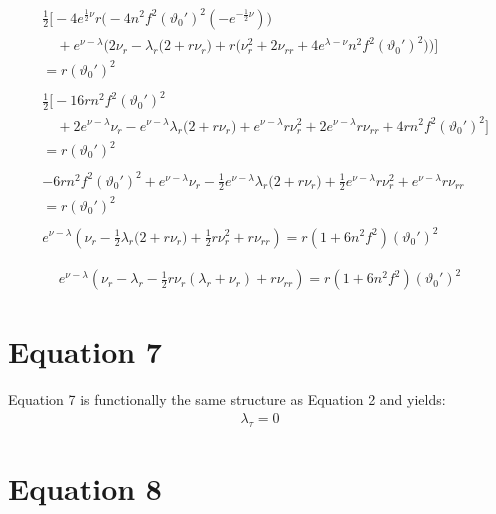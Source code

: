 \documentclass[12pt]{article}
\begin{document}
\begin{align*}
&\frac{1}{2}
\Big[- 4 e^{\frac{1}{2}\nu} r 
    \big(
        - 4 n^2 f^2 (\vartheta_0')^2 (- e^{-\frac{1}{2}\nu})
    \big) \\
    & \quad + e^{\nu-\lambda} 
    \Big(
        2 \nu_r
        - \lambda_r
        \big(2 + r \nu_r \big)
        + r \big(
            \nu_r^2 
            + 2 \nu_{rr} 
            + 4 e^{\lambda-\nu} n^2 f^2 (\vartheta_0')^2
        \big)
    \Big)
\Big] \\
&= r (\vartheta_0')^2 \\ \\
&\frac{1}{2}
\Big[-16  r n^2 f^2 (\vartheta_0')^2 \\
    & \quad +
        2 e^{\nu-\lambda} \nu_r
        - e^{\nu-\lambda} \lambda_r
        \big(2 + r \nu_r \big)
        + e^{\nu-\lambda} r\nu_r^2 
        + 2e^{\nu-\lambda} r \nu_{rr} 
        + 4 r n^2 f^2 (\vartheta_0')^2
\Big] \\
&= r (\vartheta_0')^2 \\ \\
&-6 r n^2 f^2 (\vartheta_0')^2 +
e^{\nu-\lambda} \nu_r
- \frac{1}{2} e^{\nu-\lambda} \lambda_r
\big(2 + r \nu_r \big)
+ \frac{1}{2} e^{\nu-\lambda} r\nu_r^2 
+ e^{\nu-\lambda} r \nu_{rr} \\
&= r (\vartheta_0')^2 \\ \\
& e^{\nu-\lambda} \left(\nu_r
- \frac{1}{2} \lambda_r
\big(2 + r \nu_r \big)
+ \frac{1}{2} r\nu_r^2 
+ r \nu_{rr} \right)
= r(1 + 6 n^2 f^2 ) (\vartheta_0')^2
\end{align*}

\begin{align}
e^{\nu-\lambda} \left(\nu_r - \lambda_r - \frac{1}{2} r \nu_r \left( \lambda_r + \nu_r \right) + r \nu_{rr} \right) = r(1 + 6 n^2 f^2 ) (\vartheta_0')^2
\end{align}

\section*{Equation 7}

Equation 7 is functionally the same structure as Equation 2 and yields:
\begin{align}
  \lambda_\tau = 0
\end{align}

\section*{Equation 8}
\end{document}
